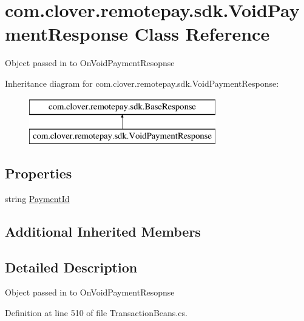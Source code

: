 \hypertarget{classcom_1_1clover_1_1remotepay_1_1sdk_1_1_void_payment_response}{}\section{com.\+clover.\+remotepay.\+sdk.\+Void\+Payment\+Response Class Reference}
\label{classcom_1_1clover_1_1remotepay_1_1sdk_1_1_void_payment_response}


Object passed in to On\+Void\+Payment\+Resopnse  


Inheritance diagram for com.\+clover.\+remotepay.\+sdk.\+Void\+Payment\+Response\+:\begin{figure}[H]
\begin{center}
\leavevmode
\includegraphics[height=2.000000cm]{classcom_1_1clover_1_1remotepay_1_1sdk_1_1_void_payment_response}
\end{center}
\end{figure}
\subsection*{Properties}
\begin{DoxyCompactItemize}
\item 
string \hyperlink{classcom_1_1clover_1_1remotepay_1_1sdk_1_1_void_payment_response_a952690e3d72ac4e86f3097900e48f80a}{Payment\+Id}
\end{DoxyCompactItemize}
\subsection*{Additional Inherited Members}


\subsection{Detailed Description}
Object passed in to On\+Void\+Payment\+Resopnse 



Definition at line 510 of file Transaction\+Beans.\+cs.



